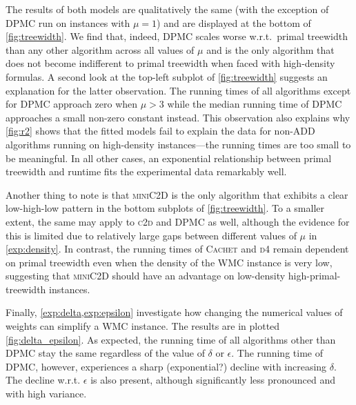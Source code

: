 The results of both models are qualitatively the same (with the exception of
\textsc{DPMC} run on instances with $\mu = 1$) and are displayed at the bottom
of \cref{fig:treewidth}. We find that, indeed, \textsc{DPMC} scales worse
w.r.t.\ primal treewidth than any other algorithm across all values of $\mu$ and
is the only algorithm that does not become indifferent to primal treewidth when
faced with high-density formulas. A second look at the top-left subplot of
\cref{fig:treewidth} suggests an explanation for the latter observation. The
running times of all algorithms except for \textsc{DPMC} approach zero when
$\mu > 3$ while the median running time of \textsc{DPMC} approaches a small
non-zero constant instead. This observation also explains why \cref{fig:r2}
shows that the fitted models fail to explain the data for non-ADD algorithms
running on high-density instances---the running times are too small to be
meaningful. In all other cases, an exponential relationship between primal
treewidth and runtime fits the experimental data remarkably well.

Another thing to note is that \textsc{miniC2D} \citep{DBLP:conf/ijcai/OztokD15}
is the only algorithm that exhibits a clear low-high-low pattern in the bottom
subplots of \cref{fig:treewidth}. To a smaller extent, the same may apply to
\textsc{c2d} and \textsc{DPMC} as well, although the evidence for this is
limited due to relatively large gaps between different values of $\mu$ in
\cref{exp:density}. In contrast, the running times of \textsc{Cachet} and
\textsc{d4} remain dependent on primal treewidth even when the density of the
WMC instance is very low, suggesting that \textsc{miniC2D} should have an
advantage on low-density high-primal-treewidth instances.

Finally, \cref{exp:delta,exp:epsilon} investigate how changing the numerical
values of weights can simplify a WMC instance. The results are in plotted
\cref{fig:delta_epsilon}. As expected, the running time of all algorithms other
than \textsc{DPMC} stay the same regardless of the value of $\delta$ or
$\epsilon$. The running time of \textsc{DPMC}, however, experiences a sharp
(exponential?) decline with increasing $\delta$. The decline w.r.t. $\epsilon$
is also present, although significantly less pronounced and with high variance.

